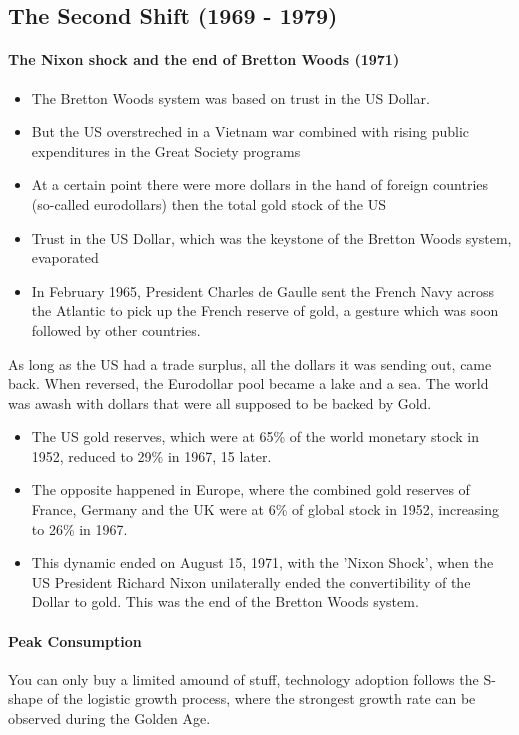 \subsection{The Second Shift (1969 - 1979)}

\paragraph{The Nixon shock and the end of Bretton Woods (1971)}

\begin{itemize}
    \item The Bretton Woods system was based on trust in the US Dollar.
    \item But the US overstreched in a Vietnam war combined with rising
        public expenditures in the Great Society programs
    \item At a certain point there were more dollars in the hand of foreign
        countries (so-called eurodollars) then the total gold stock of the US
    \item Trust in the US Dollar, which was the keystone of the Bretton Woods
        system, evaporated
    \item In February 1965, President Charles de Gaulle sent the French Navy
        across the Atlantic to pick up the French reserve of gold, a gesture
        which was soon followed by other countries.
\end{itemize}
As long as the US had a trade surplus, all the dollars it was sending out,
came back. When reversed, the Eurodollar pool became a lake and a sea. The
world was awash with dollars that were all supposed to be backed by Gold.

\begin{itemize}
    \item The US gold reserves, which were at 65\% of the world monetary stock
        in 1952, reduced to 29\% in 1967, 15 later.
    \item The opposite happened in Europe, where the combined gold reserves
        of France, Germany and the UK were at 6\% of global stock in 1952,
        increasing to 26\% in 1967.
    \item This dynamic ended on August 15, 1971, with the 'Nixon Shock', when
        the US President Richard Nixon unilaterally ended the convertibility
        of the Dollar to gold. This was the end of the Bretton Woods system.
\end{itemize}

\paragraph{Peak Consumption}
You can only buy a limited amound of stuff, technology adoption follows
the S-shape of the logistic growth process, where the strongest growth
rate can be observed during the Golden Age.

